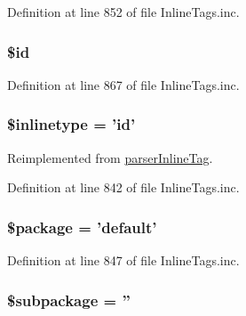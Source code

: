 \-Definition at line 852 of file \-Inline\-Tags.\-inc.

\hypertarget{classparser_id_inline_tag_ae97941710d863131c700f069b109991e}{
\subsubsection[{\$id}]{\setlength{\rightskip}{0pt plus 5cm}\$id}}\label{classparser_id_inline_tag_ae97941710d863131c700f069b109991e}


\-Definition at line 867 of file \-Inline\-Tags.\-inc.

\hypertarget{classparser_id_inline_tag_a7583c1b3912b7afa3f038eb353a6ad97}{
\subsubsection[{\$inlinetype}]{\setlength{\rightskip}{0pt plus 5cm}\$inlinetype = 'id'}}\label{classparser_id_inline_tag_a7583c1b3912b7afa3f038eb353a6ad97}


\-Reimplemented from \hyperlink{classparser_inline_tag_a7583c1b3912b7afa3f038eb353a6ad97}{parser\-Inline\-Tag}.



\-Definition at line 842 of file \-Inline\-Tags.\-inc.

\hypertarget{classparser_id_inline_tag_a365395516cc195292e97e09bc0d165ae}{
\subsubsection[{\$package}]{\setlength{\rightskip}{0pt plus 5cm}\$package = 'default'}}\label{classparser_id_inline_tag_a365395516cc195292e97e09bc0d165ae}


\-Definition at line 847 of file \-Inline\-Tags.\-inc.

\hypertarget{classparser_id_inline_tag_ac601dc8dc2a086b6381128cc9c7a3fc5}{
\subsubsection[{\$subpackage}]{\setlength{\rightskip}{0pt plus 5cm}\$subpackage = ''}}\label{classparser_id_inline_tag_ac601dc8dc2a086b6381128cc9c7a3fc5}



